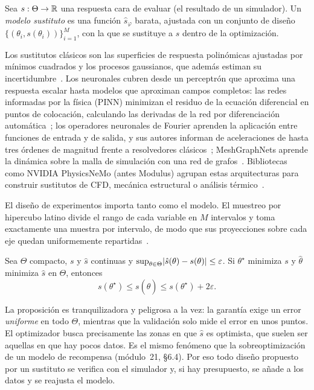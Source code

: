 \begin{definicion}\label{def:sustituto}
Sea $s:\Theta\to\mathbb{R}$ una respuesta cara de evaluar (el resultado de un simulador). Un \emph{modelo sustituto} es una función $\hat s_\varphi$ barata, ajustada con un conjunto de diseño $\{(\theta_i,s(\theta_i))\}_{i=1}^M$, con la que se sustituye a $s$ dentro de la optimización.
\end{definicion}

Los sustitutos clásicos son las superficies de respuesta polinómicas ajustadas por mínimos cuadrados y los procesos gaussianos, que además estiman su incertidumbre~\cite{kw}. Los neuronales cubren desde un perceptrón que aproxima una respuesta escalar hasta modelos que aproximan campos completos: las redes informadas por la física (PINN) minimizan el residuo de la ecuación diferencial en puntos de colocación, calculando las derivadas de la red por diferenciación automática~\cite{pinn}; los operadores neuronales de Fourier aprenden la aplicación entre funciones de entrada y de salida, y sus autores informan de aceleraciones de hasta tres órdenes de magnitud frente a resolvedores clásicos~\cite{fno}; MeshGraphNets aprende la dinámica sobre la malla de simulación con una red de grafos~\cite{mgn}. Bibliotecas como NVIDIA PhysicsNeMo (antes Modulus) agrupan estas arquitecturas para construir sustitutos de CFD, mecánica estructural o análisis térmico~\cite{physicsnemo}.

El diseño de experimentos importa tanto como el modelo. El muestreo por hipercubo latino divide el rango de cada variable en $M$ intervalos y toma exactamente una muestra por intervalo, de modo que sus proyecciones sobre cada eje quedan uniformemente repartidas~\cite{kw}.

\begin{proposicion}\label{prop:2eps}
Sea $\Theta$ compacto, $s$ y $\hat s$ continuas y $\sup_{\theta\in\Theta}\lvert\hat s(\theta)-s(\theta)\rvert\le\varepsilon$. Si $\theta^\star$ minimiza $s$ y $\hat\theta$ minimiza $\hat s$ en $\Theta$, entonces
\[
s(\theta^\star)\le s(\hat\theta)\le s(\theta^\star)+2\varepsilon .
\]
\end{proposicion}

La proposición es tranquilizadora y peligrosa a la vez: la garantía exige un error \emph{uniforme} en todo $\Theta$, mientras que la validación solo mide el error en unos puntos. El optimizador busca precisamente las zonas en que $\hat s$ es optimista, que suelen ser aquellas en que hay pocos datos. Es el mismo fenómeno que la sobreoptimización de un modelo de recompensa (módulo~21, §6.4). Por eso todo diseño propuesto por un sustituto se verifica con el simulador y, si hay presupuesto, se añade a los datos y se reajusta el modelo.

